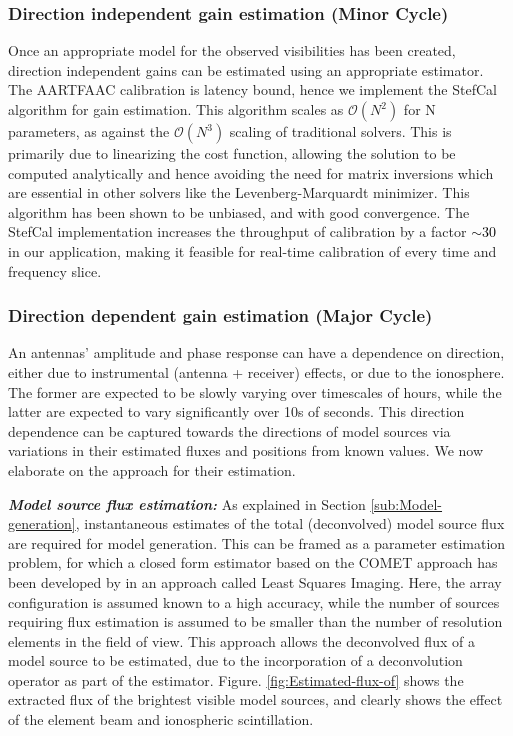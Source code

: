 \documentclass{aa}
\begin{document}
\subsubsection{\label{sub:Direction-independent-gain}Direction independent gain
estimation (Minor Cycle)}

Once an appropriate model for the observed visibilities has been created,
direction independent gains can be estimated using an appropriate
estimator. The AARTFAAC calibration is latency bound, hence we implement
the StefCal\cite{salvini2013stef} algorithm for gain estimation.
This algorithm scales as $\mathcal{O}(N^{2})$ for N parameters, as
against the $\mathcal{O}(N^{3})$ scaling of traditional solvers.
This is primarily due to linearizing the cost function, allowing the
solution to be computed analytically and hence avoiding the need for
matrix inversions which are essential in other solvers like the Levenberg-Marquardt
minimizer. This algorithm has been shown to be unbiased, and with
good convergence. The StefCal implementation increases the throughput
of calibration by a factor\textcolor{black}{{} $\sim$30}\textcolor{red}{{}
}in our application, making it feasible for real-time calibration
of every time and frequency slice.


\subsubsection{\label{sub:Direction-dependent-gain}Direction dependent gain estimation
(Major Cycle)}

An antennas' amplitude and phase response can have a dependence on
direction, either due to instrumental (antenna + receiver) effects,
or due to the ionosphere. The former are expected to be slowly varying
over timescales of hours, while the latter are expected to vary significantly
over 10s of seconds. This direction dependence can be captured towards
the directions of model sources via variations in their estimated
fluxes and positions from known values. We now elaborate on the approach
for their estimation.



\textbf{\emph{Model source flux estimation:}} As explained in Section
\ref{sub:Model-generation}, instantaneous estimates of the total
(deconvolved) model source flux are required for model generation.
This can be framed as a parameter estimation problem, for which a
closed form estimator based on the COMET approach has been developed
by \cite{wijnholds2008fundamental} in an approach called Least Squares
Imaging. Here, the array configuration is assumed known to a high
accuracy, while the number of sources requiring flux estimation is
assumed to be smaller than the number of resolution elements in the
field of view. This approach allows the deconvolved flux of a model
source to be estimated, due to the incorporation of a deconvolution
operator as part of the estimator. Figure. \ref{fig:Estimated-flux-of}
shows the extracted flux of the brightest visible model sources, and
clearly shows the effect of the element beam and ionospheric scintillation.
\end{document}
